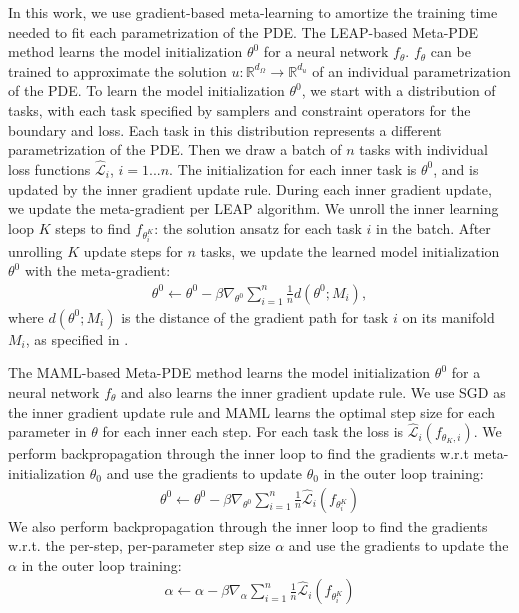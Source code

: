 In this work, we use gradient-based meta-learning to amortize the training time needed to fit each parametrization of the PDE. The LEAP-based Meta-PDE method learns the model initialization $\theta^0$ for a neural network $f_\theta$. $f_\theta$ can be trained to approximate the solution $u: \mathbb{R}^{d_\Omega} \to \mathbb{R}^{d_u}$ of an individual parametrization of the PDE. To learn the model initialization $\theta^0$, we start with a distribution of tasks, with each task specified by samplers and constraint operators for the boundary and loss. Each task in this distribution represents a different parametrization of the PDE. Then we draw a batch of $n$ tasks with individual loss functions $\hat{\mathcal{L}}_i$, $i = 1 ... n$. The initialization for each inner task is $\theta^0$, and is updated by the inner gradient update rule. During each inner gradient update, we update the meta-gradient per LEAP algorithm. We unroll the inner learning loop $K$ steps to find $f_{\theta_i^K}$: the solution ansatz for each task $i$ in the batch. After unrolling $K$ update steps for $n$ tasks, we update the learned model initialization $\theta^0$ with the meta-gradient:
\begin{align}
    \theta^0 \leftarrow \theta^0 - \beta \nabla_{\theta^0}\sum_{i=1}^n \frac{1}{n} d(\theta^0; M_i),
\end{align}
where $d(\theta^0; M_i)$ is the distance of the gradient path for task $i$ on its manifold $M_i$, as specified in \citep{flennerhag2018transferring}.

The MAML-based Meta-PDE method learns the model initialization $\theta^0$ for a neural network $f_\theta$ and also learns the inner gradient update rule. We use SGD as the inner gradient update rule and MAML learns the optimal step size for each parameter in $\theta$ for each inner each step. For each task the loss is $\hat{\mathcal{L}}_i(f_{\theta_K, i})$. We perform backpropagation through the inner loop to find the gradients w.r.t meta-initialization $\theta_0$ and use the gradients to update $\theta_0$ in the outer loop training:
\begin{align}
    \theta^0 \leftarrow \theta^0 - \beta \nabla_{\theta^0} \sum_{i=1}^n  \frac{1}{n} \hat{\mathcal{L}}_i(f_{\theta^K _i})
\end{align}
We also perform backpropagation through the inner loop to find the gradients w.r.t. the per-step, per-parameter step size $\alpha$ and use the gradients to update the $\alpha$ in the outer loop training:
\begin{align}
    {\alpha}  \leftarrow {\alpha} - \beta  \nabla_{\alpha} \sum_{i=1}^n  \frac{1}{n} \hat{\mathcal{L}}_i(f_{\theta^K_i})
\end{align}

